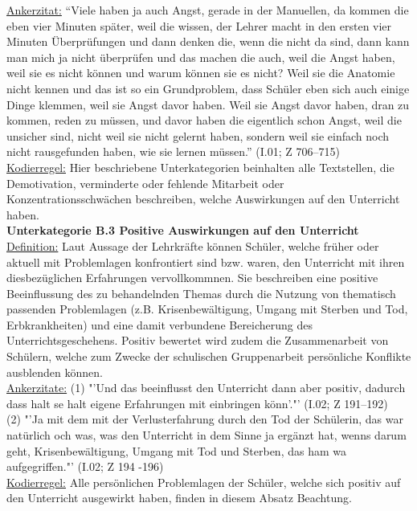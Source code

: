 \underline{Ankerzitat:} "`Viele haben ja auch Angst, gerade in der Manuellen, da kommen die eben vier Minuten später, weil die wissen, der Lehrer macht in den ersten vier Minuten Überprüfungen und dann denken die, wenn die nicht da sind, dann kann man mich ja nicht überprüfen und das machen die auch, weil die Angst haben, weil sie es nicht können und warum können sie es nicht? Weil sie die Anatomie nicht kennen und das ist so ein Grundproblem, dass Schüler eben sich auch einige Dinge klemmen, weil sie Angst davor haben. Weil sie Angst davor haben, dran zu kommen, reden zu müssen, und davor haben die eigentlich schon Angst, weil die unsicher sind, nicht weil sie nicht gelernt haben, sondern weil sie einfach noch nicht rausgefunden haben, wie sie lernen müssen."' (I.01; Z 706--715)\\
\underline{Kodierregel:} Hier beschriebene Unterkategorien beinhalten alle Textstellen, die Demotivation, verminderte oder fehlende Mitarbeit oder Konzentrationsschwächen beschreiben, welche Auswirkungen auf den Unterricht haben.\\

\noindent
\textbf{Unterkategorie B.3 Positive Auswirkungen auf den Unterricht}\\
\underline{Definition:} Laut Aussage der Lehrkräfte können Schüler, welche früher oder aktuell mit Problemlagen konfrontiert sind bzw. waren, den Unterricht mit ihren diesbezüglichen Erfahrungen vervollkommnen. Sie beschreiben eine positive Beeinflussung des zu behandelnden Themas durch die Nutzung von thematisch passenden Problemlagen (z.B. Krisenbewältigung, Umgang mit Sterben und Tod, Erbkrankheiten) und eine damit verbundene Bereicherung des Unterrichtsgeschehens. Positiv bewertet wird zudem die Zusammenarbeit von Schülern, welche zum Zwecke der schulischen Gruppenarbeit persönliche Konflikte ausblenden können.\\
\underline{Ankerzitate:} (1) "'Und das beeinflusst den Unterricht dann aber positiv, dadurch dass halt se halt eigene Erfahrungen mit einbringen könn'."' (I.02; Z 191--192)\\ (2) "'Ja mit dem mit der Verlusterfahrung durch den Tod der Schülerin, das war natürlich och was, was den Unterricht in dem Sinne ja ergänzt hat, wenns darum geht, Krisenbewältigung, Umgang mit Tod und Sterben, das ham wa aufgegriffen."' (I.02; Z 194 -196)\\
\underline{Kodierregel:} Alle persönlichen Problemlagen der Schüler, welche sich positiv auf den Unterricht ausgewirkt haben, finden in diesem Absatz Beachtung.\\


